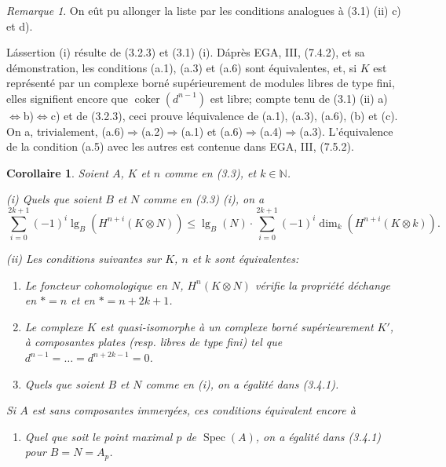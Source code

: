 \documentclass[12pt]{amsart}
\theoremstyle{plain}
\newtheorem{cor}[prop]{Corollaire}
\theoremstyle{remark}
\newtheorem{rem}[prop]{Remarque}
\DeclareMathOperator{\coker}{coker}
\DeclareMathOperator{\Spec}{Spec}
\DeclareMathOperator{\lgB}{lg}
\begin{document}
\begin{rem}\label{rem:3.3.3}
On e\^ut pu allonger la liste par les conditions analogues \`a (3.1) (ii) c) et d).
\end{rem}

L\'assertion (i) r\'esulte de (3.2.3) et (3.1) (i). D\'apr\`es EGA, III, (7.4.2), et sa d\'emonstration, les conditions (a.1), (a.3) et (a.6) sont \'equivalentes, et, si $K$ est repr\'esent\'e par un complexe born\'e sup\'erieurement de modules libres de type fini, elles signifient encore que $\coker(d^{n-1})$ est libre; compte tenu de (3.1) (ii) a)$\Leftrightarrow$b)$\Leftrightarrow$c) et de (3.2.3), ceci prouve l\'equivalence de (a.1), (a.3), (a.6), (b) et (c). On a, trivialement, (a.6)$\Rightarrow$(a.2)$\Rightarrow$(a.1) et (a.6)$\Rightarrow$(a.4)$\Rightarrow$(a.3). L'\'equivalence de la condition (a.5) avec les autres est contenue dans EGA, III, (7.5.2).

\begin{cor}\label{cor:3.4}
Soient $A$, $K$ et $n$ comme en (3.3), et $k \in \mathbb{N}$.

\textup{(i)} Quels que soient $B$ et $N$ comme en (3.3) (i), on a
\begin{equation}\label{eq:3.4.1}
\sum_{i=0}^{2k+1} (-1)^i \lgB_B(H^{n+i}(K \otimes N)) \leq \lgB_B(N) \cdot \sum_{i=0}^{2k+1} (-1)^i \dim_k(H^{n+i}(K \otimes k)).
\end{equation}

\textup{(ii)} Les conditions suivantes sur $K$, $n$ et $k$ sont \'equivalentes:
\begin{enumerate}
\item[(a)] Le foncteur cohomologique en $N$, $H^n(K \otimes N)$ v\'erifie la propri\'et\'e d\'echange en $* = n$ et en $* = n + 2k + 1$.
\item[(a$'$)] Le complexe $K$ est quasi-isomorphe \`a un complexe born\'e sup\'erieurement $K'$, \`a composantes plates (resp. libres de type fini) tel que $d^{n-1} = \ldots = d^{n+2k-1} = 0$.
\item[(b)] Quels que soient $B$ et $N$ comme en (i), on a \'egalit\'e dans (3.4.1).
\end{enumerate}
Si $A$ est sans composantes immerg\'ees, ces conditions \'equivalent encore \`a
\begin{enumerate}
\item[(c)] Quel que soit le point maximal $p$ de $\Spec(A)$, on a \'egalit\'e dans (3.4.1) pour $B = N = A_p$.
\end{enumerate}
\end{cor}
\end{document}
